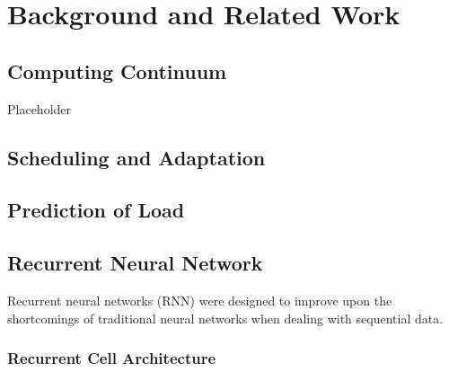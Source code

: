 \chapter{Background and Related Work}
\label{ch:background}

    \section{Computing Continuum}
    \label{sec:computing-continuum-background}

        Placeholder

    \section{Scheduling and Adaptation}
    \label{sec:scheduling-and-adaptation-background}

    \section{Prediction of Load}
    \label{sec:prediction-of-load-background}

    \section{Recurrent Neural Network}
    \label{sec:rnn-background}

        Recurrent neural networks (RNN) were designed to improve upon the shortcomings of traditional neural networks when dealing with sequential data.
        
        
        \subsection{Recurrent Cell Architecture}
        \label{sec:recurrent-cell-architecture-background}


